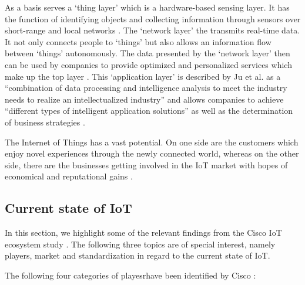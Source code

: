 	As a basis serves a `thing layer' which is a hardware-based sensing layer. It has the function of identifying objects and collecting information through sensors over short-range and local networks \cite{ju}. The `network layer' the transmits real-time data. It not only connects people to `things' but also allows an information flow between `things' autonomously. The data presented by the `network layer' then can be used by companies to provide optimized and personalized services which make up the top layer \cite{ju}. This `application layer' is described by Ju et al. as a ``combination of data processing and intelligence analysis to meet the industry needs to realize an intellectualized industry'' \cite{ju}  and allows companies to achieve ``different types of intelligent application solutions'' as well as the determination of business strategies \cite{ju} .

	The Internet of Things has a vast potential. On one side are the customers which enjoy novel experiences through the newly connected world, whereas on the other side, there are the businesses getting involved in the IoT market with hopes of economical and reputational gains \cite{ju}. 
	

	\subsection{Current state of IoT}
		In this section, we highlight some of the relevant findings from the Cisco IoT ecosystem study \cite{cisco}. The following three topics are of special interest, namely players, market and standardization in regard to the current state of IoT.

		The following four categories of playesrhave been identified by Cisco \cite{cisco}: 


